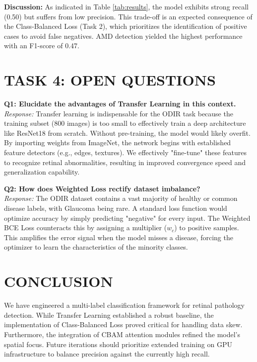 \documentclass[10pt, letterpaper, twocolumn]{article}
\begin{document}
\noindent \textbf{Discussion:} As indicated in Table \ref{tab:results}, the model exhibits strong recall (0.50) but suffers from low precision. This trade-off is an expected consequence of the Class-Balanced Loss (Task 2), which prioritizes the identification of positive cases to avoid false negatives. AMD detection yielded the highest performance with an F1-score of 0.47.

\section{TASK 4: OPEN QUESTIONS}
\label{sec:open_questions}

\textbf{Q1: Elucidate the advantages of Transfer Learning in this context.} \\
\textit{Response:} Transfer learning is indispensable for the ODIR task because the training subset (800 images) is too small to effectively train a deep architecture like ResNet18 from scratch. Without pre-training, the model would likely overfit. By importing weights from ImageNet, the network begins with established feature detectors (e.g., edges, textures). We effectively "fine-tune" these features to recognize retinal abnormalities, resulting in improved convergence speed and generalization capability.

\textbf{Q2: How does Weighted Loss rectify dataset imbalance?} \\
\textit{Response:} The ODIR dataset contains a vast majority of healthy or common disease labels, with Glaucoma being rare. A standard loss function would optimize accuracy by simply predicting "negative" for every input. The Weighted BCE Loss counteracts this by assigning a multiplier ($w_c$) to positive samples. This amplifies the error signal when the model misses a disease, forcing the optimizer to learn the characteristics of the minority classes.

\section{CONCLUSION}
We have engineered a multi-label classification framework for retinal pathology detection. While Transfer Learning established a robust baseline, the implementation of Class-Balanced Loss proved critical for handling data skew. Furthermore, the integration of CBAM attention modules refined the model's spatial focus. Future iterations should prioritize extended training on GPU infrastructure to balance precision against the currently high recall.
\end{document}
